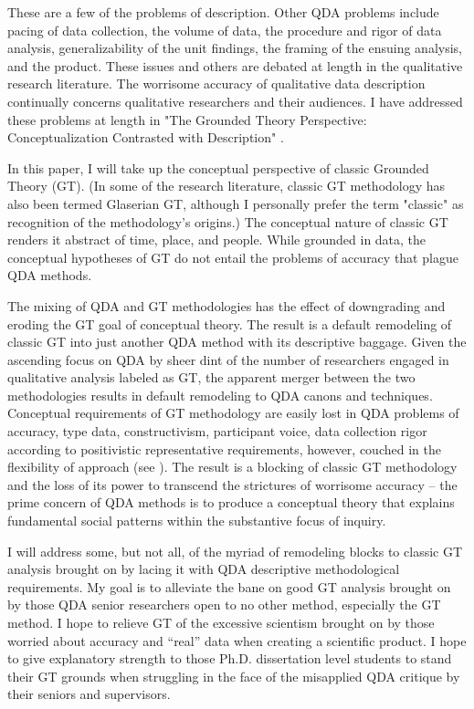 These are a few of the problems of description. Other QDA problems include
pacing of data collection, the volume of data, the procedure and rigor of data
analysis, generalizability of the unit findings, the framing of the ensuing analysis, and the product. These issues and others are debated at length in the
qualitative research literature. The worrisome accuracy of qualitative data description
continually concerns qualitative researchers and their audiences. I have
addressed these problems at length in "The Grounded Theory Perspective:
Conceptualization Contrasted with Description"
\citep{book.glaser01}.

In this paper, I will take up the conceptual perspective of classic Grounded Theory (GT).
(In some of the research literature,
classic GT methodology has also been termed Glaserian GT,
although I personally prefer the term "classic" as recognition of the methodology’s origins.)
The conceptual nature of classic GT renders it abstract of time, place, and people.
While grounded in data,
the conceptual hypotheses of GT do not entail the problems of accuracy that plague QDA methods.

The mixing of QDA and GT methodologies has the effect of downgrading and eroding the GT goal of conceptual theory.
The result is a default remodeling of classic GT into just another QDA method with its descriptive baggage.
Given the ascending focus on QDA by sheer dint of the number of researchers engaged in qualitative analysis labeled as GT, the apparent merger between the two methodologies results in default remodeling to QDA canons and techniques.
Conceptual requirements of GT methodology are easily lost in QDA problems of accuracy, type data, constructivism, participant voice, data collection rigor according to positivistic representative requirements, however, couched in the flexibility of approach (see \citep{article.lowe97}). 
The result is a blocking of classic GT methodology and the loss of its power to transcend the strictures of worrisome accuracy – 
the prime concern of QDA methods is to produce a conceptual theory that explains fundamental social patterns within the substantive focus of inquiry.

I will address some, but not all, of the myriad of remodeling blocks to classic GT analysis brought on by lacing it with QDA descriptive methodological requirements. 
My goal is to alleviate the bane on good GT analysis brought on by those QDA senior researchers open to no other method, especially the GT method. 
I hope to relieve GT of the excessive scientism brought on by those worried about accuracy and “real” data when creating a scientific product. 
I hope to give explanatory strength to those Ph.D. dissertation level students to stand their GT grounds when struggling in the face of the misapplied QDA critique by their seniors and supervisors.

